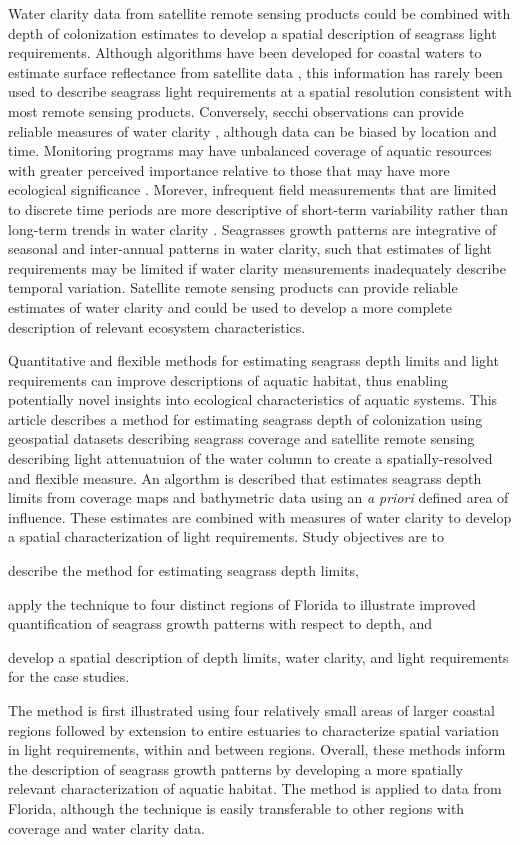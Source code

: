 \documentclass[letterpaper,12pt,oneside]{article}\usepackage[]{graphicx}\usepackage[]{color}
\begin{document}
Water clarity data from satellite remote sensing products could be combined with depth of colonization estimates to develop a spatial description of seagrass light requirements.  Although algorithms have been developed for coastal waters to estimate surface reflectance from satellite data \citep{Woodruff99,Chen07}, this information has rarely been used to describe seagrass light requirements at a spatial resolution consistent with most remote sensing products.  Conversely, secchi observations can provide reliable measures of water clarity , although data can be biased by location and time.  Monitoring programs may have unbalanced coverage of aquatic resources with greater perceived importance relative to those that may have more ecological significance \citep{Wagner08,Lottig14}.  Morever, infrequent field measurements that are limited to discrete time periods are more descriptive of short-term variability rather than long-term trends in water clarity \citep{Elsdon09}.  Seagrasses growth patterns are integrative of seasonal and inter-annual patterns in water clarity, such that estimates of light requirements may be limited if water clarity measurements inadequately describe temporal variation.  Satellite remote sensing products can provide reliable estimates of water clarity and could be used to develop a more complete description of relevant ecosystem characteristics.  

Quantitative and flexible methods for estimating seagrass depth limits and light requirements can improve descriptions of aquatic habitat, thus enabling potentially novel insights into ecological characteristics of aquatic systems.  This article describes a method for estimating seagrass depth of colonization using geospatial datasets describing seagrass coverage and satellite remote sensing describing light attenuatuion of the water column to create a spatially-resolved and flexible measure.  An algorthm is described that estimates seagrass depth limits from coverage maps and bathymetric data using an \textit{a priori} defined area of influence. These estimates are combined with measures of water clarity to develop a spatial characterization of light requirements.  Study objectives are to\begin{inparaenum}[1\upshape)]
\item describe the method for estimating seagrass depth limits, 
\item apply the technique to four distinct regions of Florida to illustrate improved quantification of seagrass growth patterns with respect to depth, and
\item develop a spatial description of depth limits, water clarity, and light requirements for the case studies.  
\end{inparaenum}
The method is first illustrated using four relatively small areas of larger coastal regions followed by extension to entire estuaries to characterize spatial variation in light requirements, within and between regions.  Overall, these methods inform the description of seagrass growth patterns by developing a more spatially relevant characterization of aquatic habitat.  The method is applied to data from Florida, although the technique is easily transferable to other regions with coverage and water clarity data. 
\end{document}
